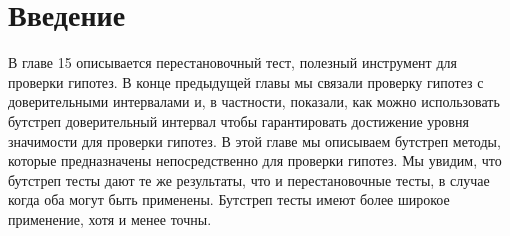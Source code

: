\section{Введение}

В главе 15 описывается перестановочный тест, полезный инструмент для проверки гипотез. В конце предыдущей главы мы связали проверку гипотез с доверительными интервалами и, в частности, показали, как можно использовать бутстреп доверительный интервал чтобы гарантировать достижение уровня значимости для проверки гипотез. В этой главе мы описываем бутстреп методы, которые предназначены непосредственно для проверки гипотез. Мы увидим, что бутстреп тесты дают те же результаты, что и перестановочные тесты, в случае когда оба могут быть применены. Бутстреп тесты имеют более широкое применение, хотя и менее точны.